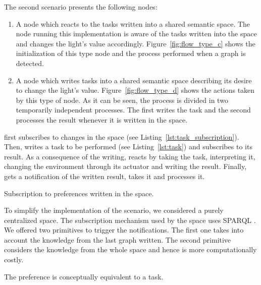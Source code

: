 The second scenario presents the following nodes:
\begin{enumerate}[resume,label=\itshape(\alph*\upshape)]
  \item A node which reacts to the tasks written into a shared semantic space.
	The node running this implementation is aware of the tasks written into the space and changes the light's value accordingly. %
	Figure~\ref{fig:flow_type_c} shows the initialization of this type node and the process performed when a graph is detected.
	
  \item A node which writes tasks into a shared semantic space describing its desire to change the light's value.
	Figure~\ref{fig:flow_type_d} shows the actions taken by this type of node.
	As it can be seen, the process is divided in two temporarily independent processes.
	The first writes the task and the second processes the result whenever it is written in the space.
\end{enumerate}


\nodec{} first subscribes to changes in the space (see Listing~\ref{lst:task_subscription}).
Then, \noded{} writes a task to be performed (see Listing~\ref{lst:task}) and subscribes to its result.
As a consequence of the writing, \nodec{} reacts by taking the task, interpreting it, changing the environment through its actuator and writing the result.
Finally, \noded{} gets a notification of the written result, takes it and processes it.


\begin{listing}
  
  \caption{Subscription to preferences written in the space.}
  \label{lst:task_subscription}
\end{listing}


To simplify the implementation of the scenario, we considered a purely centralized space.
The subscription mechanism used by the space uses SPARQL .
We offered two primitives to trigger the notifications.
The first one takes into account the knowledge from the last graph written.
The second primitive considers the knowledge from the whole space and hence is more computationally costly.

\begin{listing}
  
  \caption{The preference is conceptually equivalent to a task.}
  \label{lst:task}
\end{listing}



